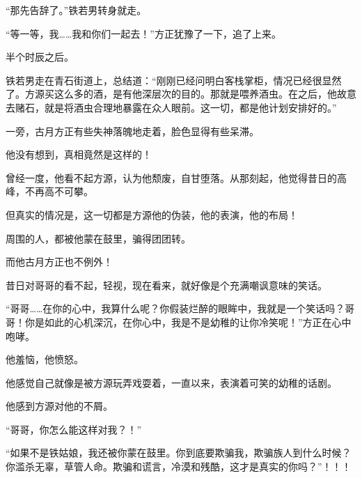 \begin{this_body}
“那先告辞了。”铁若男转身就走。

“等一等，我……我和你们一起去！”方正犹豫了一下，追了上来。

半个时辰之后。

铁若男走在青石街道上，总结道：“刚刚已经问明白客栈掌柜，情况已经很显然了。方源买这么多的酒，是有他深层次的目的。那就是喂养酒虫。在之后，他故意去赌石，就是将酒虫合理地暴露在众人眼前。这一切，都是他计划安排好的。”

一旁，古月方正有些失神落魄地走着，脸色显得有些呆滞。

他没有想到，真相竟然是这样的！

曾经一度，他看不起方源，认为他颓废，自甘堕落。从那刻起，他觉得昔日的高峰，不再高不可攀。

但真实的情况是，这一切都是方源他的伪装，他的表演，他的布局！

周围的人，都被他蒙在鼓里，骗得团团转。

而他古月方正也不例外！

昔日对哥哥的看不起，轻视，现在看来，就好像是个充满嘲讽意味的笑话。

“哥哥……在你的心中，我算什么呢？你假装烂醉的眼眸中，我就是一个笑话吗？哥哥！你是如此的心机深沉，在你心中，我是不是幼稚的让你冷笑呢！”方正在心中咆哮。

他羞恼，他愤怒。

他感觉自己就像是被方源玩弄戏耍着，一直以来，表演着可笑的幼稚的话剧。

他感到方源对他的不屑。

“哥哥，你怎么能这样对我？！”

“如果不是铁姑娘，我还被你蒙在鼓里。你到底要欺骗我，欺骗族人到什么时候？你滥杀无辜，草管人命。欺骗和谎言，冷漠和残酷，这才是真实的你吗？”！！！

\end{this_body}

